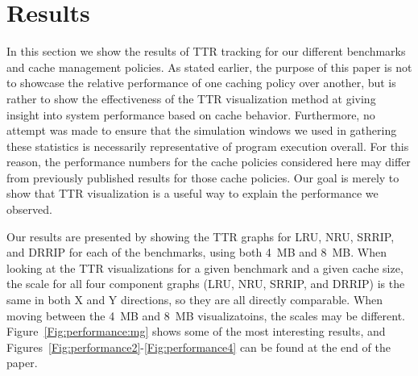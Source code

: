 \section{Results}

In this section we show the results of TTR tracking for our different
benchmarks and cache management policies.  
As stated earlier, the purpose of this paper is not to showcase the relative
performance of one caching policy over another, but is rather to show
the effectiveness of the TTR visualization method at giving
insight into system performance based on cache behavior.
Furthermore, no attempt was made to ensure that the simulation windows
we used in gathering these statistics is necessarily representative of
program execution overall.  
For this reason, the performance numbers for the cache policies considered 
here may differ from previously published results for those cache policies.
Our goal is merely to show that TTR
visualization is a useful way to explain the performance we observed.


\begin{figure*}
  \centerline{
  }
  \centerline{
  }
  \centerline{
  }
\caption{Time to Recache}
\label{Fig:performance:mg}
\end{figure*}

Our results are presented by showing the TTR graphs for LRU, NRU,
SRRIP, and DRRIP for each of the benchmarks, using both 4~MB and
8~MB.  
When looking at the TTR visualizations for a given
benchmark and a given cache size, the scale for all four component
graphs (LRU, NRU, SRRIP, and DRRIP) is the same in both X and Y
directions, so they are all directly comparable.  When moving between
the 4~MB and 8~MB visualizatoins, the scales may be different.
Figure~\ref{Fig:performance:mg} shows some of the most interesting 
results, and Figures~\ref{Fig:performance2}-\ref{Fig:performance4} 
can be found at the end of the paper.

